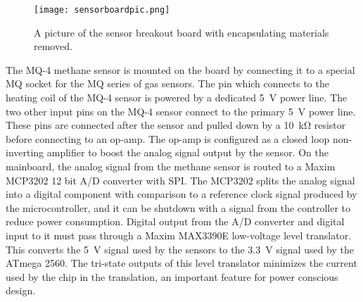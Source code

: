 \documentclass[numbook, envcountsect, envcountsame, envcountreset, runningheads, twocolumn]{svjour3}
\begin{document}
			
			
			
			\begin{figure}[!t]
				\centering
				\texttt{[image: sensorboardpic.png]}
				\caption[Sensor breakout board]{A picture of the sensor breakout board with encapsulating materials removed.}
				\label{fig:sensorboardpic}
			\end{figure}
			
			The MQ-4 methane sensor is mounted on the board by connecting it to a special MQ socket for the MQ series of gas sensors.  The pin which connects to the heating coil of the MQ-4 sensor is powered by a dedicated \SI{5}{\volt} power line.  The two other input pins on the MQ-4 sensor connect to the primary \SI{5}{\volt} power line.  These pins are connected after the sensor and pulled down by a \SI{10}{\kilo\ohm} resistor before connecting to an op-amp.  The op-amp is configured as a closed loop non-inverting amplifier to boost the analog signal output by the sensor.  On the mainboard, the analog signal from the methane sensor is routed to a Maxim MCP3202 12 bit A/D converter with SPI.  The MCP3202 splits the analog signal into a digital component with comparison to a reference clock signal produced by the microcontroller, and it can be shutdown with a signal from the controller to reduce power consumption.  Digital output from the A/D converter and digital input to it must pass through a Maxim MAX3390E low-voltage level translator.  This converts the \SI{5}{\volt} signal used by the sensors to the \SI{3.3}{\volt} signal used by the ATmega 2560.  The tri-state outputs of this level translator minimizes the current used by the chip in the translation, an important feature for power conscious design.  
			
\end{document}
